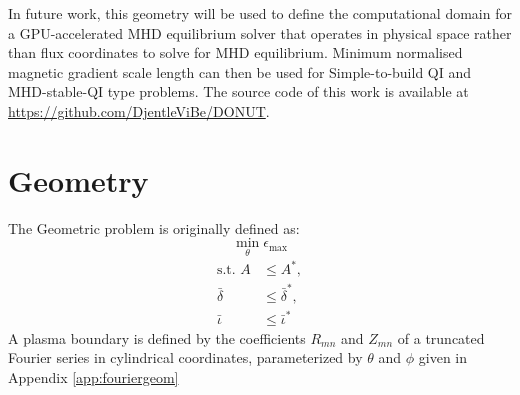 \documentclass{article}
\begin{document}
In future work, this geometry will be used to define the computational 
domain for a GPU-accelerated MHD equilibrium solver that 
operates in physical space rather than flux coordinates to solve 
for MHD equilibrium. Minimum normalised magnetic gradient scale length 
can then be used for Simple-to-build QI and MHD-stable-QI type problems.
The source code of this work is available at \url{https://github.com/DjentleViBe/DONUT}.
\section{Geometry}
The Geometric problem is originally defined as:
\begin{equation}
\min_{\theta} \epsilon_{\text{max}}
\label{min}
\end{equation}
\begin{align}
\label{constr1}
\text{s.t. } A &\leq A^*,\\
\label{constr2}
\bar{\delta} &\leq \bar{\delta}^*,\\
\label{constr3}
\bar{\iota} &\leq \bar{\iota}^*
\end{align}
A plasma boundary is defined by the coefficients $R_{mn}$ and $Z_{mn}$ of a truncated Fourier series 
in cylindrical coordinates, parameterized by $\theta$
and $\phi$ given in Appendix \ref{app:fouriergeom}
\end{document}
